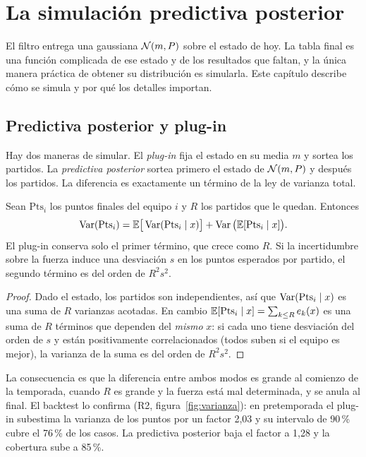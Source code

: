 \chapter{La simulación predictiva posterior}
\label{cap:sim}

El filtro entrega una gaussiana $\mathcal{N}(m,P)$ sobre el estado de hoy. La tabla final es una función complicada de ese estado y de los resultados que faltan, y la única manera práctica de obtener su distribución es simularla. Este capítulo describe cómo se simula y por qué los detalles importan.

\section{Predictiva posterior y plug-in}

Hay dos maneras de simular. El \emph{plug-in} fija el estado en su media $m$ y sortea los partidos. La \emph{predictiva posterior} sortea primero el estado de $\mathcal{N}(m,P)$ y después los partidos. La diferencia es exactamente un término de la ley de varianza total.

\begin{proposicion} \dem
Sean $\mathrm{Pts}_i$ los puntos finales del equipo $i$ y $R$ los partidos que le quedan. Entonces
\[
\operatorname{Var}(\mathrm{Pts}_i)=\mathbb{E}\big[\operatorname{Var}(\mathrm{Pts}_i\mid x)\big]+\operatorname{Var}\big(\mathbb{E}[\mathrm{Pts}_i\mid x]\big).
\]
El plug-in conserva solo el primer término, que crece como $R$. Si la incertidumbre sobre la fuerza induce una desviación $s$ en los puntos esperados por partido, el segundo término es del orden de $R^2s^2$.
\end{proposicion}

\begin{proof}
Dado el estado, los partidos son independientes, así que $\operatorname{Var}(\mathrm{Pts}_i\mid x)$ es una suma de $R$ varianzas acotadas. En cambio $\mathbb{E}[\mathrm{Pts}_i\mid x]=\sum_{k\le R}e_k(x)$ es una suma de $R$ términos que dependen del \emph{mismo} $x$: si cada uno tiene desviación del orden de $s$ y están positivamente correlacionados (todos suben si el equipo es mejor), la varianza de la suma es del orden de $R^2s^2$.
\end{proof}

La consecuencia es que la diferencia entre ambos modos es grande al comienzo de la temporada, cuando $R$ es grande y la fuerza está mal determinada, y se anula al final. El backtest lo confirma (R2, figura~\ref{fig:varianza}): en pretemporada el plug-in subestima la varianza de los puntos por un factor 2,03 y su intervalo de 90\,\% cubre el 76\,\% de los casos. La predictiva posterior baja el factor a 1,28 y la cobertura sube a 85\,\%.

